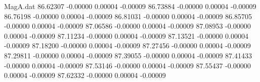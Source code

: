 \begin{filecontents}{MagA.dat}
  86.62307   -0.00000    0.00004   -0.00009
  86.73884   -0.00000    0.00004   -0.00009
  86.76198   -0.00000    0.00004   -0.00009
  86.81031   -0.00000    0.00004   -0.00009
  86.85705   -0.00000    0.00004   -0.00009
  87.06586   -0.00000    0.00004   -0.00009
  87.08953   -0.00000    0.00004   -0.00009
  87.11234   -0.00000    0.00004   -0.00009
  87.13521   -0.00000    0.00004   -0.00009
  87.18200   -0.00000    0.00004   -0.00009
  87.27456   -0.00000    0.00004   -0.00009
  87.29811   -0.00000    0.00004   -0.00009
  87.39055   -0.00000    0.00004   -0.00009
  87.41433   -0.00000    0.00004   -0.00009
  87.53146   -0.00000    0.00004   -0.00009
  87.55437   -0.00000    0.00004   -0.00009
  87.62332   -0.00000    0.00004   -0.00009
\end{filecontents}
